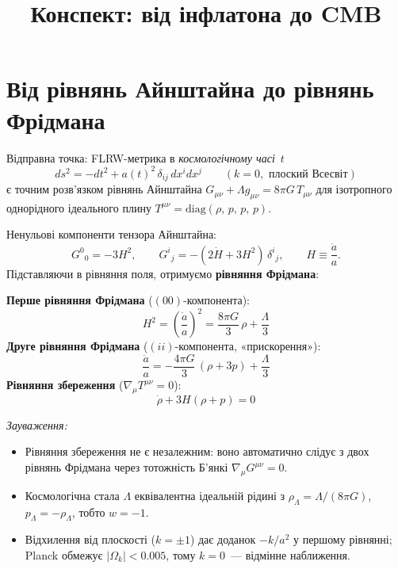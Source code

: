 \documentclass[12pt, a4paper]{article}
\title{\bfseries Конспект: від інфлатона до CMB}
\author{}
\date{}
\begin{document}
\maketitle
\tableofcontents
\newpage

\section{Від рівнянь Айнштайна до рівнянь Фрідмана}

Відправна точка: FLRW-метрика в \emph{космологічному часі}~$t$
\begin{equation}\label{eq:FLRW}
  ds^2 = -dt^2 + a(t)^2\,\delta_{ij}\,dx^i dx^j
  \qquad (k=0,\text{ плоский Всесвіт})
\end{equation}
є точним розв'язком рівнянь Айнштайна
$G_{\mu\nu} + \Lambda g_{\mu\nu} = 8\pi G\,T_{\mu\nu}$
для ізотропного однорідного ідеального плину
$T^{\mu\nu} = \mathrm{diag}(\rho,\,p,\,p,\,p)$.

Ненульові компоненти тензора Айнштайна:
\begin{equation*}
  G^0{}_0 = -3H^2,
  \qquad
  G^i{}_j = -(2\dot H + 3H^2)\,\delta^i{}_j,
  \qquad
  H \equiv \frac{\dot a}{a}.
\end{equation*}
Підставляючи в рівняння поля, отримуємо \textbf{рівняння Фрідмана}:

\begin{keybox}
\textbf{Перше рівняння Фрідмана} ($(00)$-компонента):
\begin{equation}\label{eq:F1}
  H^2 = \left(\frac{\dot a}{a}\right)^2 = \frac{8\pi G}{3}\,\rho + \frac{\Lambda}{3}
\end{equation}
\textbf{Друге рівняння Фрідмана} ($(ii)$-компонента, «прискорення»):
\begin{equation}\label{eq:F2}
  \frac{\ddot a}{a} = -\frac{4\pi G}{3}\,(\rho + 3p) + \frac{\Lambda}{3}
\end{equation}
\textbf{Рівняння збереження} ($\nabla_\mu T^{\mu\nu} = 0$):
\begin{equation}\label{eq:conservation_low}
  \dot\rho + 3H(\rho + p) = 0
\end{equation}
\end{keybox}

\noindent
\textit{Зауваження:}
\begin{itemize}
  \item Рівняння збереження не є незалежним: воно автоматично слідує
        з двох рівнянь Фрідмана через тотожність Б'янкі
        $\nabla_\mu G^{\mu\nu} = 0$.
  \item Космологічна стала $\Lambda$ еквівалентна ідеальній рідині
        з $\rho_\Lambda = \Lambda/(8\pi G)$, $p_\Lambda = -\rho_\Lambda$,
        тобто $w = -1$.
  \item Відхилення від плоскості ($k = \pm 1$) дає доданок
        $-k/a^2$ у першому рівнянні; Planck обмежує $|\Omega_k| < 0.005$,
        тому $k=0$~--- відмінне наближення.
\end{itemize}
\end{document}
